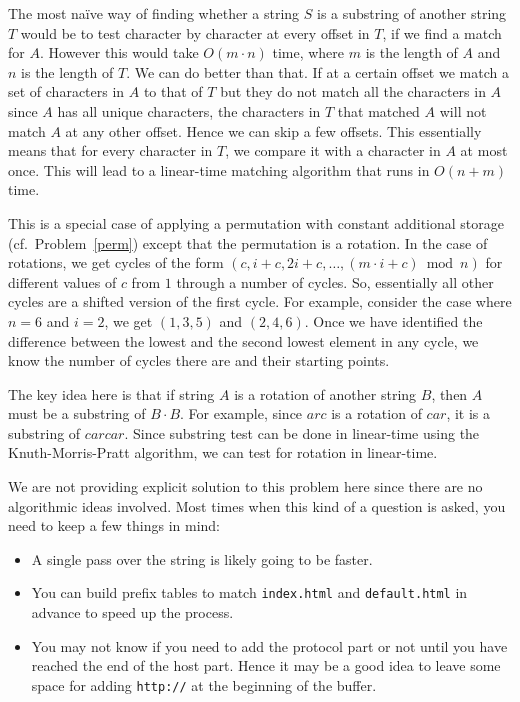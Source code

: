 The most na\"{i}ve way of finding whether a string $S$ is a substring of
another string $T$  would be to test character by character at every
offset in $T$, if we find a match for $A$. However this would take
$O(m \cdot n)$ time, where $m$ is the length of $A$ and $n$ is the length of $T$.
We can do better than that. If at a certain offset we match a
set  of characters in $A$ to that of $T$ but they do not match all
the characters in $A$  since $A$ has all unique characters,  the
characters in $T$ that matched $A$ will not match $A$ at any other
offset. Hence we can skip a few offsets. 
This essentially means that for every character in $T$, we
compare it with a character in $A$ at most once.  This will lead to a
linear-time matching algorithm that runs in $O(n +m)$ time.

This is a special case of applying a permutation with constant
additional storage (cf.~Problem~\ref{perm}) except that the permutation is a rotation. In the 
case of rotations, we get cycles of the form $(c,i+c,2i+c,\ldots, (m \cdot i
 + c)\bmod n)$ for different values of $c$ from $1$ through  a number of cycles. So, essentially all other
cycles are a shifted version of the first cycle. For example, consider
the case where $n = 6$ and $i = 2$, we get $(1,3,5)$ and $(2,4,6)$.
Once we have identified the difference between the lowest and the second lowest element in any cycle, we know the number of cycles there are
and their starting points.

The key idea here is that if string $A$ is a rotation of another
string $B$, then $A$ must be a substring of $B \cdot B$. For example, since
$arc$ is a rotation of $car$, it is a substring of $carcar$. Since
substring test can be done in linear-time using the Knuth-Morris-Pratt
algorithm, we can test for rotation in linear-time.

We are not providing explicit solution to this problem here since
there are no algorithmic ideas involved. Most times when this
kind of a
question is asked, you need to keep a few things in mind:
\begin{itemize}
\item A single pass over the string is likely going to be faster.
\item You can build prefix tables to match \texttt{index.html} and \texttt{default.html}
  in advance to speed up the process.
\item You may not know if you need to add the protocol part or not
  until you have reached the end of the host part. Hence it may be a good idea to leave some 
  space for adding \texttt{http://} at the beginning of the buffer.
\end{itemize}

